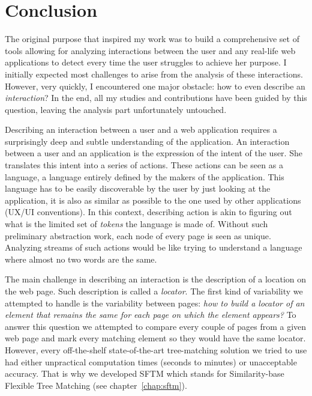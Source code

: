 \chapter{Conclusion}
\label{ch:conclusion}

The original purpose that inspired my work was to build a comprehensive set of tools allowing for analyzing interactions between the user and any real-life web applications to detect every time the user struggles to achieve her purpose. 
I initially expected most challenges to arise from the analysis of these interactions. 
However, very quickly, I encountered one major obstacle: how to even describe an \textit{interaction}?
In the end, all my studies and contributions have been guided by this question, leaving the analysis part unfortunately untouched.

Describing an interaction between a user and a web application requires a surprisingly deep and subtle understanding of the application. 
An interaction between a user and an application is the expression of the intent of the user.
She translates this intent into a series of actions. These actions can be seen as a language,
a language entirely defined by the makers of the application.
This language has to be easily discoverable by the user by just looking at the application, it is also as similar as possible to the one used by other applications (UX/UI conventions). 
In this context, describing action is akin to figuring out what is the limited set of \textit{tokens} the language is made of.
Without such preliminary abstraction work, each node of every page is seen as unique. 
Analyzing streams of such actions would be like trying to understand a language where almost no two words are the same.

The main challenge in describing an interaction is the description of a location on the web page.
Such description is called a \textit{locator}. The first kind of variability we attempted to handle is the variability between pages: \textit{how to build a locator of an element that remains the same for each page on which the element appears?}
To answer this question we attempted to compare every couple of pages from a given web page and mark every matching element so they would have the same locator. 
However, every off-the-shelf state-of-the-art tree-matching solution we tried to use had either unpractical computation times (seconds to minutes) or unacceptable accuracy.
That is why we developed SFTM which stands for Similarity-base Flexible Tree Matching (see chapter~\ref{chap:sftm}).

